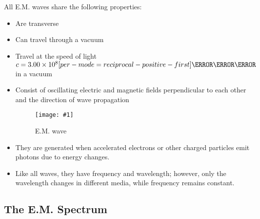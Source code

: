 \documentclass[a4paper,12pt]{article}
\let\oldsi\si
\renewcommand{\si}[1]{\oldsi[per-mode=reciprocal-positive-first]{#1}}
\newcommand{\img}[4]{\begin{center}
  \begin{figure}[H]
    \centering
    \texttt{[image: \#1]}
    \caption{#3}
    \label{fig:#4}
  \end{figure}
\end{center}}
\begin{document}
All E.M. waves share the following properties:
\begin{itemize}
  \item Are transverse
  \item Can travel through a vacuum
  \item Travel at the speed of light $c = 3.00 \times 10^8 \si{\meter\per\second}$ in a vacuum
  \item Consist of oscillating electric and magnetic fields perpendicular to each other and the direction of wave propagation
        \img{em.png}{0.6}{E.M. wave}{em}
  \item They are generated when accelerated electrons or other charged particles emit photons due to energy changes.
  \item Like all waves, they have frequency and wavelength; however, only the wavelength changes in different media, while frequency remains constant.
\end{itemize}

\pagebreak

\subsection{The E.M. Spectrum}
\end{document}
